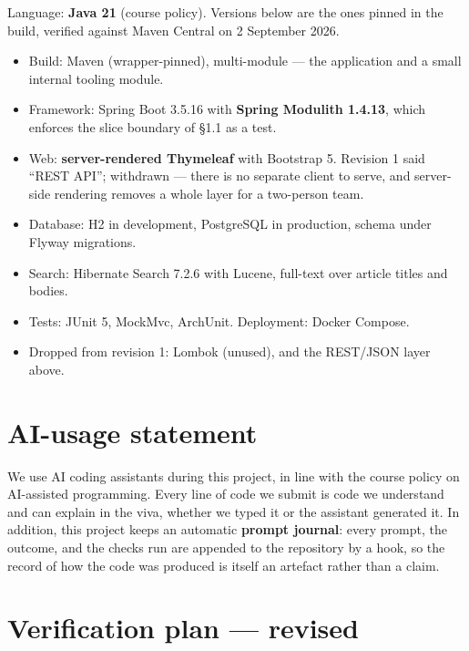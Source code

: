 \documentclass[11pt]{article}
\begin{document}
Language: \textbf{Java 21} (course policy). Versions below are the ones pinned in the build,
verified against Maven Central on 2 September 2026.

\begin{itemize}
  \item Build: Maven (wrapper-pinned), multi-module --- the application and a small internal tooling
        module.
  \item Framework: Spring Boot 3.5.16 with \textbf{Spring Modulith 1.4.13}, which enforces the slice
        boundary of \S1.1 as a test.
  \item Web: \textbf{server-rendered Thymeleaf} with Bootstrap 5. Revision 1 said ``REST API'';
        withdrawn --- there is no separate client to serve, and server-side rendering removes a whole
        layer for a two-person team.
  \item Database: H2 in development, PostgreSQL in production, schema under Flyway migrations.
  \item Search: Hibernate Search 7.2.6 with Lucene, full-text over article titles and bodies.
  \item Tests: JUnit 5, MockMvc, ArchUnit. \quad Deployment: Docker Compose.
  \item Dropped from revision 1: Lombok (unused), and the REST/JSON layer above.
\end{itemize}

\section{AI-usage statement}

We use AI coding assistants during this project, in line with the course policy on AI-assisted
programming. Every line of code we submit is code we understand and can explain in the viva, whether
we typed it or the assistant generated it. In addition, this project keeps an automatic
\textbf{prompt journal}: every prompt, the outcome, and the checks run are appended to the
repository by a hook, so the record of how the code was produced is itself an artefact rather than a
claim.

\section{Verification plan --- revised}
\end{document}
